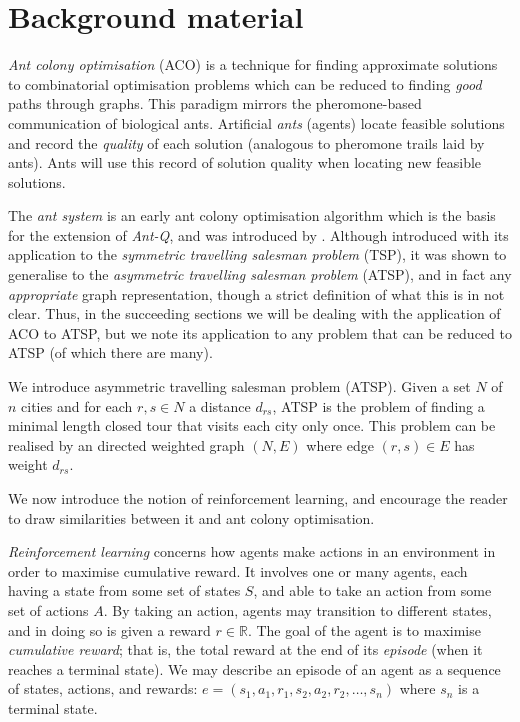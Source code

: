 \section{Background material}

\emph{Ant colony optimisation} (ACO) is a technique for finding approximate solutions to combinatorial optimisation problems which can be reduced to finding \emph{good} paths through graphs. This paradigm mirrors the pheromone-based communication of biological ants. Artificial \emph{ants} (agents) locate feasible solutions and record the \emph{quality} of each solution (analogous to pheromone trails laid by ants). Ants will use this record of solution quality when locating new feasible solutions.

The \emph{ant system} is an early ant colony optimisation algorithm which is the basis for the extension of \emph{Ant-Q}, and was introduced by \textcite{dorigo1996ant}. Although introduced with its application to the \emph{symmetric travelling salesman problem} (TSP), it was shown to generalise to the \emph{asymmetric travelling salesman problem} (ATSP), and in fact any \emph{appropriate} graph representation, though a strict definition of what this is in not clear. Thus, in the succeeding sections we will be dealing with the application of ACO to ATSP, but we note its application to any problem that can be reduced to ATSP (of which there are many).

We introduce asymmetric travelling salesman problem (ATSP). Given a set $N$ of $n$ cities and for each $r, s \in N$ a distance $d_{rs}$, ATSP is the problem of finding a minimal length closed tour that visits each city only once. This problem can be realised by an directed weighted graph $(N, E)$ where edge $(r, s) \in E$ has weight $d_{rs}$.

We now introduce the notion of reinforcement learning, and encourage the reader to draw similarities between it and ant colony optimisation.

\emph{Reinforcement learning} concerns how agents make actions in an environment in order to maximise cumulative reward. It involves one or many agents, each having a state from some set of states $S$, and able to take an action from some set of actions $A$. By taking an action, agents may transition to different states, and in doing so is given a reward $r \in \mathbb R$. The goal of the agent is to maximise \emph{cumulative reward}; that is, the total reward at the end of its \emph{episode} (when it reaches a terminal state). We may describe an episode of an agent as a sequence of states, actions, and rewards: $e = (s_1, a_1, r_1, s_2, a_2, r_2, \ldots, s_n)$ where $s_n$ is a terminal state.

